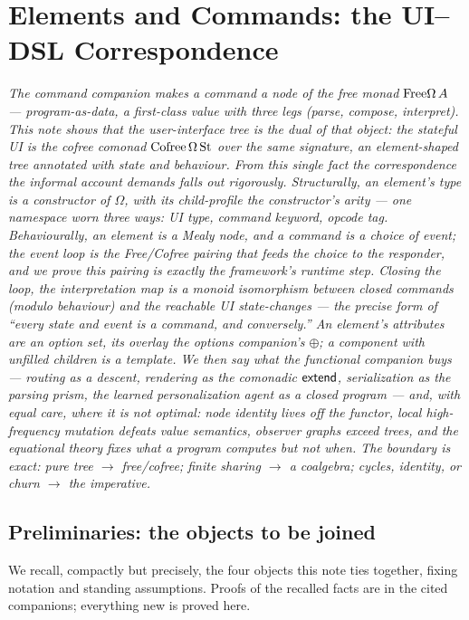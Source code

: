 \documentclass[../uxoxo-main]{subfiles}
\begin{document}
\chapter{Elements and Commands: the UI--DSL Correspondence}


\begingroup\itshape\small
\noindent
The command companion makes a command a node of the free monad $\mathrm{Free}\Omega\,A$
--- program-as-data, a first-class value with three legs (parse, compose,
interpret). This note shows that the user-interface tree is the
\emph{dual} of that object: the stateful UI is the cofree comonad
$\mathrm{Cofree}\,\Omega\,\mathrm{St}$ over the \emph{same} signature, an element-shaped tree
annotated with state and behaviour. From this single fact the correspondence the
informal account demands falls out rigorously. \emph{Structurally}, an element's
type is a constructor of $\Omega$, with its child-profile the constructor's
arity --- one namespace worn three ways: UI type, command keyword, opcode tag.
\emph{Behaviourally}, an element is a Mealy node, and a command is a choice of
event; the event loop is the \emph{Free/Cofree pairing} that feeds the choice to
the responder, and we prove this pairing is exactly the framework's runtime step.
Closing the loop, the interpretation map is a monoid isomorphism between closed
commands (modulo behaviour) and the reachable UI state-changes --- the precise
form of ``every state and event is a command, and conversely.'' An element's
attributes are an option set, its overlay the options companion's $\oplus$; a
component with unfilled children is a template. We then say what the functional
companion buys --- routing as a  descent, rendering as the
comonadic $\mathsf{extend}$, serialization as the parsing prism, the learned
personalization agent as a closed program --- and, with equal care, where it is
\emph{not} optimal: node identity lives off the functor, local high-frequency
mutation defeats value semantics, observer graphs exceed trees, and the
equational theory fixes \emph{what} a program computes but not \emph{when}. The
boundary is exact: pure tree $\to$ free/cofree; finite sharing $\to$ a coalgebra;
cycles, identity, or churn $\to$ the imperative.
\par\endgroup\medskip


\section{Preliminaries: the objects to be joined}\label{sec:prelim}
We recall, compactly but precisely, the four objects this note ties together,
fixing notation and standing assumptions. Proofs of the recalled facts are in the
cited companions; everything new is proved here.
\end{document}

